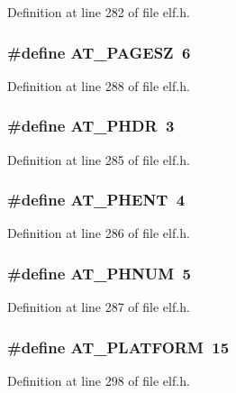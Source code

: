 Definition at line 282 of file elf.h.
\subsubsection[{AT\_\-PAGESZ}]{\setlength{\rightskip}{0pt plus 5cm}\#define AT\_\-PAGESZ~6}\label{elf_8h_7269f0c135d4bd3f9bc074d18fb30f9d}




Definition at line 288 of file elf.h.
\subsubsection[{AT\_\-PHDR}]{\setlength{\rightskip}{0pt plus 5cm}\#define AT\_\-PHDR~3}\label{elf_8h_3de7ec7b5cee2d34208387ab97dc0642}




Definition at line 285 of file elf.h.
\subsubsection[{AT\_\-PHENT}]{\setlength{\rightskip}{0pt plus 5cm}\#define AT\_\-PHENT~4}\label{elf_8h_56f1f9975d88f768d7928b0ed587ef38}




Definition at line 286 of file elf.h.
\subsubsection[{AT\_\-PHNUM}]{\setlength{\rightskip}{0pt plus 5cm}\#define AT\_\-PHNUM~5}\label{elf_8h_bc712c67bee059574b4e3c096538d5bd}




Definition at line 287 of file elf.h.
\subsubsection[{AT\_\-PLATFORM}]{\setlength{\rightskip}{0pt plus 5cm}\#define AT\_\-PLATFORM~15}\label{elf_8h_9e8e819c6a3e1d1353cf8ad994c8f125}




Definition at line 298 of file elf.h.
